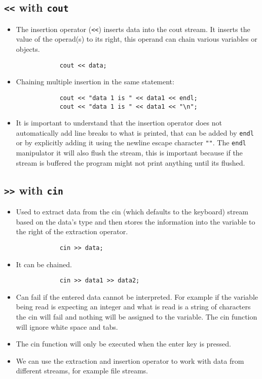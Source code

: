 \subsection{\texttt{<<} with \texttt{cout}}
\begin{itemize}
    \item The insertion operator (\texttt{<<}) inserts data into the cout stream. It inserts the value of the operad(s) to its right, this operand can chain various variables or objects.
        \begin{verbatim}
            cout << data;
        \end{verbatim}
    \item Chaining multiple insertion in the same statement: 
        \begin{verbatim}
            cout << "data 1 is " << data1 << endl;
            cout << "data 1 is " << data1 << "\n";
        \end{verbatim}
    \item It is important to understand that the insertion operator does not automatically add line breaks to what is printed, that can be added by \texttt{endl} or by explicitly adding it using the newline escape character \texttt{"\n"}. The \texttt{endl} manipulator it will also flush the stream, this is important because if the stream is buffered the program might not print anything until its flushed.
\end{itemize}

\subsection{\texttt{>>} with \texttt{cin}}
\begin{itemize}
    \item Used to extract data from the cin (which defaults to the keyboard) stream based on the data's type and then stores the information into the variable to the right of the extraction operator.
        \begin{verbatim}
            cin >> data;  
        \end{verbatim}
    \item It can be chained.
        \begin{verbatim}
            cin >> data1 >> data2;
        \end{verbatim}
    \item Can fail if the entered data cannot be interpreted. For example if the variable being read is expecting an integer and what is read is a string of characters the cin will fail and nothing will be assigned to the variable. The cin function will ignore white space and tabs.
    \item The cin function will only be executed when the enter key is pressed.
    \item We can use the extraction and insertion operator to work with data from different streams, for example file streams.
\end{itemize}


